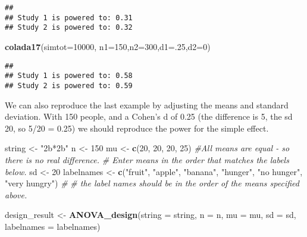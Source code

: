 \documentclass[]{article}
\newenvironment{Shaded}{\begin{snugshade}}{\end{snugshade}}
\newcommand{\KeywordTok}[1]{\textcolor[rgb]{0.13,0.29,0.53}{\textbf{#1}}}
\newcommand{\DataTypeTok}[1]{\textcolor[rgb]{0.13,0.29,0.53}{#1}}
\newcommand{\DecValTok}[1]{\textcolor[rgb]{0.00,0.00,0.81}{#1}}
\newcommand{\StringTok}[1]{\textcolor[rgb]{0.31,0.60,0.02}{#1}}
\newcommand{\CommentTok}[1]{\textcolor[rgb]{0.56,0.35,0.01}{\textit{#1}}}
\newcommand{\NormalTok}[1]{#1}
\begin{document}
\begin{verbatim}
## 
## Study 1 is powered to: 0.31
## Study 2 is powered to: 0.32
\end{verbatim}

\begin{Shaded}
\begin{Highlighting}[]
  \KeywordTok{colada17}\NormalTok{(}\DataTypeTok{simtot=}\DecValTok{10000}\NormalTok{, }\DataTypeTok{n1=}\DecValTok{150}\NormalTok{,}\DataTypeTok{n2=}\DecValTok{300}\NormalTok{,}\DataTypeTok{d1=}\NormalTok{.}\DecValTok{25}\NormalTok{,}\DataTypeTok{d2=}\DecValTok{0}\NormalTok{)}
\end{Highlighting}
\end{Shaded}

\begin{verbatim}
## 
## Study 1 is powered to: 0.58
## Study 2 is powered to: 0.59
\end{verbatim}

We can also reproduce the last example by adjusting the means and
standard deviation. With 150 people, and a Cohen's d of 0.25 (the
difference is 5, the sd 20, so 5/20 = 0.25) we should reproduce the
power for the simple effect.

\begin{Shaded}
\begin{Highlighting}[]
\NormalTok{string <-}\StringTok{ "2b*2b"}
\NormalTok{n <-}\StringTok{ }\DecValTok{150}
\NormalTok{mu <-}\StringTok{ }\KeywordTok{c}\NormalTok{(}\DecValTok{20}\NormalTok{, }\DecValTok{20}\NormalTok{, }\DecValTok{20}\NormalTok{, }\DecValTok{25}\NormalTok{) }\CommentTok{#All means are equal - so there is no real difference.}
\CommentTok{# Enter means in the order that matches the labels below.}
\NormalTok{sd <-}\StringTok{ }\DecValTok{20}
\NormalTok{labelnames <-}\StringTok{ }\KeywordTok{c}\NormalTok{(}\StringTok{"fruit"}\NormalTok{, }\StringTok{"apple"}\NormalTok{, }\StringTok{"banana"}\NormalTok{, }\StringTok{"hunger"}\NormalTok{, }\StringTok{"no hunger"}\NormalTok{, }\StringTok{"very hungry"}\NormalTok{) }\CommentTok{#}
\CommentTok{# the label names should be in the order of the means specified above.}

\NormalTok{design_result <-}\StringTok{ }\KeywordTok{ANOVA_design}\NormalTok{(}\DataTypeTok{string =}\NormalTok{ string,}
                   \DataTypeTok{n =}\NormalTok{ n, }
                   \DataTypeTok{mu =}\NormalTok{ mu, }
                   \DataTypeTok{sd =}\NormalTok{ sd, }
                   \DataTypeTok{labelnames =}\NormalTok{ labelnames)}
\end{Highlighting}
\end{Shaded}
\end{document}
